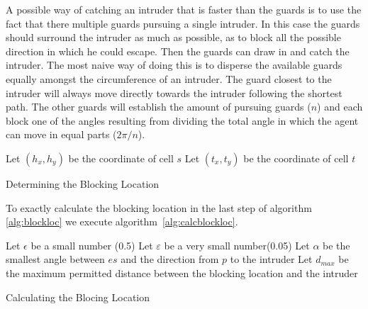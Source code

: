 A possible way of catching an intruder that is faster than the guards is to use the fact that there multiple guards pursuing a single intruder. In this case the guards should surround the intruder as much as possible, as to block all the possible direction in which he could escape. Then the guards can draw in and catch the intruder. The most naive way of doing this is to disperse the available guards equally amongst the circumference of an intruder. The guard closest to the intruder will always move directly towards the intruder following the shortest path. The other guards will establish the amount of pursuing guards ($n$) and each block one of the angles resulting from dividing the total angle in which the agent can move in equal parts ($2\pi / n$).


			\begin{algorithm}[H]
			Let $(h_x,h_y)$ be the coordinate of cell $s$\;
			Let $(t_x,t_y)$ be the coordinate of cell $t$\;
			\label{alg:blockloc}
			\caption{Determining the Blocking Location}
			\end{algorithm}

			To exactly calculate the blocking location in the last step of algorithm \ref{alg:blockloc} we execute algorithm~\ref{alg:calcblockloc}.

			\begin{algorithm}[H]
				Let $\epsilon$ be a small number (0.5)\;
				Let $\varepsilon$ be a very small number(0.05)\; 
				Let $\alpha$ be the smallest angle between $es$ and the direction from $p$ to the intruder\;
				Let $d_{max}$ be the maximum permitted distance between the blocking location and the intruder\;
				\label{alg:calcblockloc}
				\caption{Calculating the Blocing Location}
			\end{algorithm}